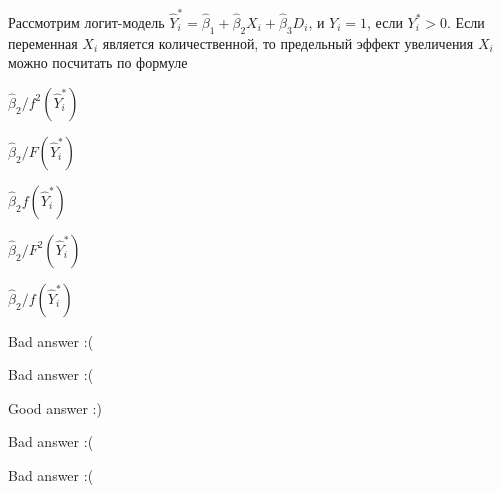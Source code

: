 
\begin{question}
Рассмотрим логит-модель \(\hat Y_i^* = \hat \beta_1 + \hat \beta_2 X_i + \hat \beta_3 D_i\), и \(Y_i = 1\), если \(Y_i^* > 0\). Если переменная \(X_i\) является количественной, то предельный эффект увеличения \(X_i\) можно посчитать по формуле
\begin{answerlist}
  \item \(\hat \beta_2 / f^2(\hat Y_i^*)\)
  \item \(\hat \beta_2 / F(\hat Y_i^*)\)
  \item \(\hat \beta_2 f(\hat Y_i^*)\)
  \item \(\hat \beta_2 /F^2(\hat Y_i^*)\)
  \item \(\hat \beta_2 /f(\hat Y_i^*)\)
\end{answerlist}
\end{question}

\begin{solution}
\begin{answerlist}
  \item Bad answer :(
  \item Bad answer :(
  \item Good answer :)
  \item Bad answer :(
  \item Bad answer :(
\end{answerlist}
\end{solution}

